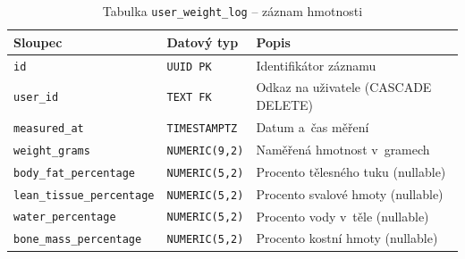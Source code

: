\begin{table}[htbp]
    \centering
    \caption{Tabulka \texttt{user\_weight\_log} -- záznam hmotnosti}
    \label{tab:weight-log}
    \begin{tabular}{|p{4.8cm}|p{3.0cm}|p{6.4cm}|}
        \hline
        \textbf{Sloupec}                  & \textbf{Datový typ}   & \textbf{Popis}                      \\
        \hline
        \texttt{id}                       & \texttt{UUID PK}      & Identifikátor záznamu               \\
        \hline
        \texttt{user\_id}                 & \texttt{TEXT FK}      & Odkaz na uživatele (CASCADE DELETE) \\
        \hline
        \texttt{measured\_at}             & \texttt{TIMESTAMPTZ}  & Datum a~čas měření                  \\
        \hline
        \texttt{weight\_grams}            & \texttt{NUMERIC(9,2)} & Naměřená hmotnost v~gramech         \\
        \hline
        \texttt{body\_fat\_percentage}    & \texttt{NUMERIC(5,2)} & Procento tělesného tuku (nullable)  \\
        \hline
        \texttt{lean\_tissue\_percentage} & \texttt{NUMERIC(5,2)} & Procento svalové hmoty (nullable)   \\
        \hline
        \texttt{water\_percentage}        & \texttt{NUMERIC(5,2)} & Procento vody v~těle (nullable)     \\
        \hline
        \texttt{bone\_mass\_percentage}   & \texttt{NUMERIC(5,2)} & Procento kostní hmoty (nullable)    \\
        \hline
    \end{tabular}
\end{table}